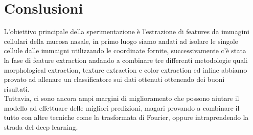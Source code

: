 \documentclass[italian,10pt,a4paper]{article}
\begin{document}
	\section{Conslusioni}
	L'obiettivo principale della sperimentazione è l'estrazione di features da immagini cellulari della mucosa nasale, in primo luogo siamo andati ad isolare le singole cellule dalle immaigni utilizzando le coordinate fornite, successivamente c'è stata la fase di feature extraction andando a combinare tre differenti metodologie quali morphological extraction, texture extraction e color extraction ed infine abbiamo provato ad allenare un classificatore sui dati ottenuti ottenendo dei buoni risultati.\\
	Tuttavia, ci sono ancora ampi margini di miglioramento che possono aiutare il modello ad effettuare delle migliori predizioni, magari provando a combinare il tutto con altre tecniche come la trasformata di Fourier, oppure intraprendendo la strada del deep learning.
	
	
	
	
	
\end{document}
